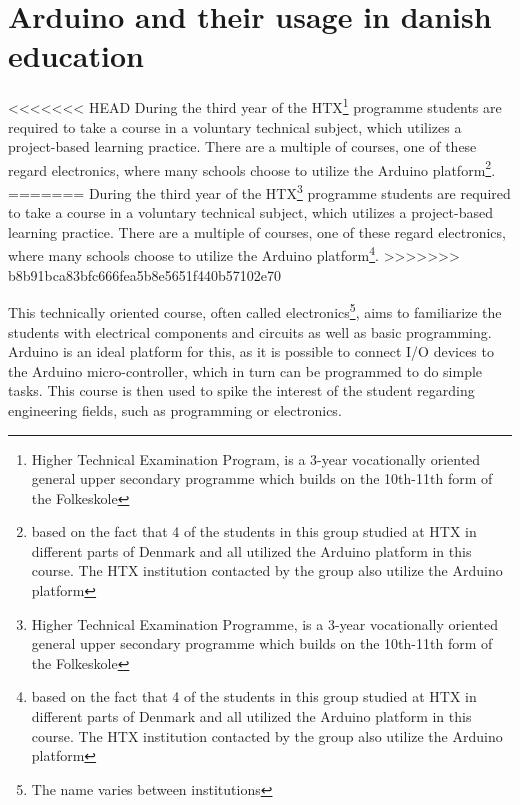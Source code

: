 
\section{Arduino and their usage in danish education}
<<<<<<< HEAD
During the third year of the HTX\footnote{Higher Technical Examination Program, is a 3-year vocationally oriented general upper secondary programme which builds on the 10th-11th form of the Folkeskole\cite{htx_wiki}} programme students are required to take a course in a voluntary technical subject, which utilizes a project-based learning practice. 
There are a multiple of courses, one of these regard electronics, where many schools choose to utilize the Arduino platform\footnote{based on the fact that 4 of the students in this group studied at HTX in different parts of Denmark and all utilized the Arduino platform in this course. The HTX institution contacted by the group also utilize the Arduino platform}\cite{holstebro_education}.
=======
During the third year of the HTX\footnote{Higher Technical Examination Programme, is a 3-year vocationally oriented general upper secondary programme which builds on the 10th-11th form of the Folkeskole\cite{htx_wiki}} programme students are required to take a course in a voluntary technical subject, which utilizes a project-based learning practice. 
There are a multiple of courses, one of these regard electronics, where many schools choose to utilize the Arduino platform\footnote{based on the fact that 4 of the students in this group studied at HTX in different parts of Denmark and all utilized the Arduino platform in this course. 
The HTX institution contacted by the group also utilize the Arduino platform}\cite{holstebro_education}.
>>>>>>> b8b91bca83bfc666fea5b8e5651f440b57102e70

This technically oriented course, often called electronics\footnote{The name varies between institutions}, aims to familiarize the students with electrical components and circuits as well as basic programming.\cite{holstebro_electronic}
Arduino is an ideal platform for this, as it is possible to connect I/O devices to the Arduino micro-controller, which in turn can be programmed to do simple tasks. 
This course is then used to spike the interest of the student regarding engineering fields, such as programming or electronics.


